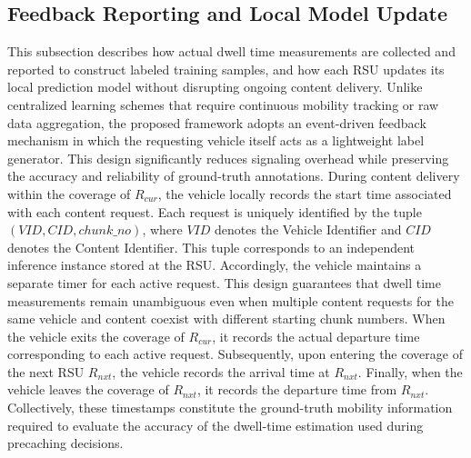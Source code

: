 \documentclass[journal]{IEEEtran}
\begin{document}
\subsection{Feedback Reporting and Local Model Update}\label{subsec:4}
This subsection describes how actual dwell time measurements are collected and reported to construct labeled training samples, and how each RSU updates its local prediction model without disrupting ongoing content delivery.
Unlike centralized learning schemes that require continuous mobility tracking or raw data aggregation, the proposed framework adopts an event-driven feedback mechanism in which the requesting vehicle itself acts as a lightweight label generator.
This design significantly reduces signaling overhead while preserving the accuracy and reliability of ground-truth annotations.
During content delivery within the coverage of $R_{cur}$, the vehicle locally records the start time associated with each content request.
Each request is uniquely identified by the tuple $(VID, CID, chunk\_no)$, where $VID$ denotes the Vehicle Identifier and $CID$ denotes the Content Identifier. This tuple corresponds to an independent inference instance stored at the RSU.
Accordingly, the vehicle maintains a separate timer for each active request.
This design guarantees that dwell time measurements remain unambiguous even when multiple content requests for the same vehicle and content coexist with different starting chunk numbers.
When the vehicle exits the coverage of $R_{cur}$, it records the actual departure time corresponding to each active request.
Subsequently, upon entering the coverage of the next RSU $R_{nxt}$, the vehicle records the arrival time at $R_{nxt}$.
Finally, when the vehicle leaves the coverage of $R_{nxt}$, it records the departure time from $R_{nxt}$.
Collectively, these timestamps constitute the ground-truth mobility information required to evaluate the accuracy of the dwell-time estimation used during precaching decisions.
\end{document}
